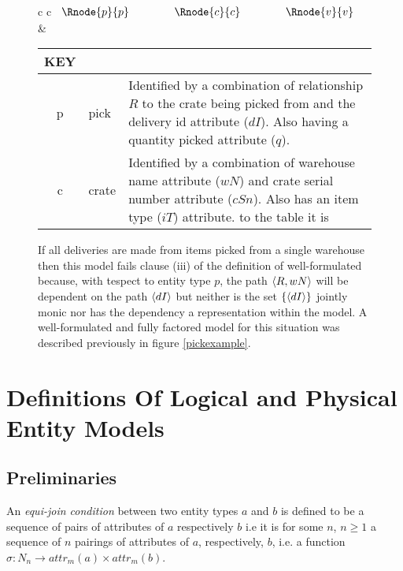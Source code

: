 \documentclass[10pt,a4paper]{article}
\newcommand{\genericmodel}{\mathcal{M}}
\renewcommand{\genericmodel}{{m}}
\newcommand{\attr}[2] [\genericmodel]{attr_{#1}(#2)}
\newcommand{\term}[1]{\textit{{#1}}}
\begin{document}
\begin{figure} [h]
\begin{center}
\begin{tabular}{c c}
$
\begin{array}{cp{0.75cm}cp{0.75cm}c}
   \Rnode{p}{p}     & & \Rnode{c}{c} & & \Rnode{v}{v}    
\end{array}
$
\idcomp
{} 
\idcomp
{} 
\idcomp
{}
\idcomp
{}
& \footnotesize
\begin{tabular}{c p{1.5cm} p{4cm}}
KEY && \\
\hline
p & pick & Identified by a combination of relationship $R$ to the crate being picked from
                and the delivery id attribute ($dI$). Also  having a quantity picked 
								attribute ($q$).\\
c & crate & Identified by a combination of warehouse name attribute ($wN$)
              and crate serial number attribute ($cSn$). Also has an item type ($iT$) attribute.
 to the table it is 
\end{tabular} 
\end{tabular}
\end{center}
\caption{If all deliveries are made from items picked from a single warehouse 
then this model fails clause (iii) of the definition of well-formulated because, with tespect to entity type $p$, the path $\langle R,wN\rangle$ will be dependent on the path $\langle dI\rangle$ but neither is the set 
$\{\langle dI\rangle\}$ jointly monic nor has the dependency a representation within the model. A well-formulated and fully factored model for this situation was described previously in 
figure \ref{pickexample}.
}
\label{pickexamplebeforenormalisation}
\end{figure}

\section{Definitions Of Logical and Physical Entity Models}
\subsection{Preliminaries}
\begin{definition}
\noindent An \term{equi-join condition} between two entity types $a$ and $b$ is defined to be a sequence of pairs of attributes of 
 $a$ respectively $b$ i.e it is for some $n$, $n \geq 1$ a sequence of $n$ pairings of attributes of $a$, respectively, $b$, i.e. a function $\sigma: N_n \rightarrow \attr{a} \times \attr{b}$. \\
\end{definition}
\end{document}
